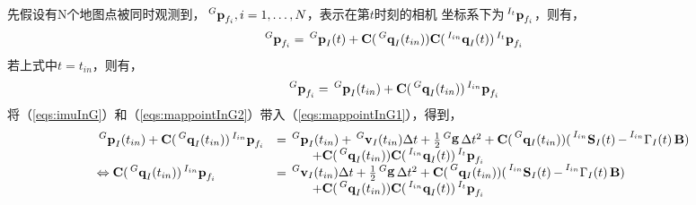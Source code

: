 \documentclass{article}
\begin{document}
\par
先假设有N个地图点被同时观测到，$\sideset{^G}{}{\mathop{\textbf{p}_{f_i}}},i=1,\dots,N$，表示在第$t$时刻的相机
坐标系下为$\sideset{^{I_t}}{}{\mathop{\textbf{p}_{f_i}}}$，则有，
\begin{equation}\label{eqs:mappointInG1}
    \sideset{^G}{}{\mathop{\textbf{p}_{f_i}}}=\sideset{^G}{}{\mathop{\textbf{p}_I}}(t)
    +\textbf{C}(\sideset{^G}{}{\mathop{\textbf{q}_{I}}}(t_{in}))\textbf{C}(\sideset{^{I_{in}}}{}{\mathop{\textbf{q}_{I}}}(t))
    \sideset{^{I_t}}{}{\mathop{\textbf{p}_{f_i}}}
\end{equation}
若上式中$t=t_{in}$，则有，
\begin{equation}\label{eqs:mappointInG2}
    \sideset{^G}{}{\mathop{\textbf{p}_{f_i}}}=\sideset{^G}{}{\mathop{\textbf{p}_I}}(t_{in})
    +\textbf{C}(\sideset{^G}{}{\mathop{\textbf{q}_{I}}}(t_{in}))
    \sideset{^{I_{in}}}{}{\mathop{\textbf{p}_{f_i}}}
\end{equation}
将（\ref{eqs:imuInG}）和（\ref{eqs:mappointInG2}）带入（\ref{eqs:mappointInG1}），得到，
\begin{equation}
    \begin{array}{ll}
        \sideset{^G}{}{\mathop{\textbf{p}_I}}(t_{in})
        +\textbf{C}(\sideset{^G}{}{\mathop{\textbf{q}_{I}}}(t_{in}))
        \sideset{^{I_{in}}}{}{\mathop{\textbf{p}_{f_i}}}
        &=\sideset{^G}{}{\mathop{\textbf{p}_{I}}}(t_{in})+
        \sideset{^G}{}{\mathop{\textbf{v}_{I}}}(t_{in})\Delta{t}
        +\frac{1}{2}\sideset{^G}{}{\mathop{\mathbf{g}}}\Delta{t}^{2}
        +\textbf{C}(\sideset{^G}{}{\mathop{\mathbf{q}_{I}(t_{in})}})
        (\sideset{^{I_{in}}}{}{\mathop{\textbf{S}_{I}(t)}}
        -\sideset{^{I_{in}}}{}{\mathop{{\Gamma}_{I}(t)}}\textbf{B})\\
        &\hspace{1cm}+\textbf{C}(\sideset{^G}{}{\mathop{\textbf{q}_{I}}}(t_{in}))\textbf{C}(\sideset{^{I_{in}}}{}{\mathop{\textbf{q}_{I}}}(t))
        \sideset{^{I_t}}{}{\mathop{\textbf{p}_{f_i}}}\\
        \Leftrightarrow
        \textbf{C}(\sideset{^G}{}{\mathop{\textbf{q}_{I}}}(t_{in}))
        \sideset{^{I_{in}}}{}{\mathop{\textbf{p}_{f_i}}}
        &=\sideset{^G}{}{\mathop{\textbf{v}_{I}}}(t_{in})\Delta{t}
        +\frac{1}{2}\sideset{^G}{}{\mathop{\mathbf{g}}}\Delta{t}^{2}
        +\textbf{C}(\sideset{^G}{}{\mathop{\mathbf{q}_{I}(t_{in})}})
        (\sideset{^{I_{in}}}{}{\mathop{\textbf{S}_{I}(t)}}
        -\sideset{^{I_{in}}}{}{\mathop{{\Gamma}_{I}(t)}}\textbf{B})\\
        &\hspace{1cm}+\textbf{C}(\sideset{^G}{}{\mathop{\textbf{q}_{I}}}(t_{in}))\textbf{C}(\sideset{^{I_{in}}}{}{\mathop{\textbf{q}_{I}}}(t))
        \sideset{^{I_t}}{}{\mathop{\textbf{p}_{f_i}}}
    \end{array}
\end{equation}
\end{document}
